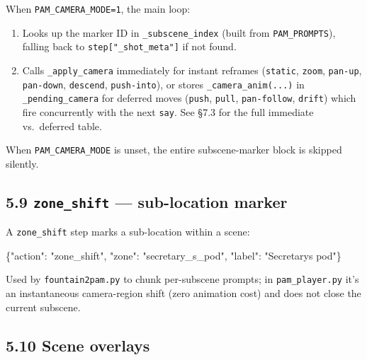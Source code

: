 \documentclass[
  11pt,
]{book}
\newenvironment{Shaded}{}{}
\newcommand{\DataTypeTok}[1]{\textcolor[rgb]{0.56,0.13,0.00}{#1}}
\newcommand{\FunctionTok}[1]{\textcolor[rgb]{0.02,0.16,0.49}{#1}}
\newcommand{\StringTok}[1]{\textcolor[rgb]{0.25,0.44,0.63}{#1}}
\providecommand{\tightlist}{%
  \setlength{\itemsep}{0pt}\setlength{\parskip}{0pt}}
\begin{document}
When \texttt{PAM\_CAMERA\_MODE=1}, the main loop:

\begin{enumerate}
\def\labelenumi{\arabic{enumi}.}
\tightlist
\item
  Looks up the marker ID in \texttt{\_subscene\_index} (built from
  \texttt{PAM\_PROMPTS}), falling back to
  \texttt{step{[}"\_shot\_meta"{]}} if not found.
\item
  Calls \texttt{\_apply\_camera} immediately for instant reframes
  (\texttt{static}, \texttt{zoom}, \texttt{pan-up}, \texttt{pan-down},
  \texttt{descend}, \texttt{push-into}), or stores
  \texttt{\_camera\_anim(...)} in \texttt{\_pending\_camera} for
  deferred moves (\texttt{push}, \texttt{pull}, \texttt{pan-follow},
  \texttt{drift}) which fire concurrently with the next \texttt{say}.
  See §7.3 for the full immediate vs.\ deferred table.
\end{enumerate}

When \texttt{PAM\_CAMERA\_MODE} is unset, the entire subscene-marker
block is skipped silently.

\subsection{\texorpdfstring{5.9 \texttt{zone\_shift} --- sub-location
marker}{5.9 zone\_shift --- sub-location marker}}\label{zone_shift-sub-location-marker}

A \texttt{zone\_shift} step marks a sub-location within a scene:

\begin{Shaded}
\begin{Highlighting}[]
\FunctionTok{\{}\DataTypeTok{"action"}\FunctionTok{:} \StringTok{"zone\_shift"}\FunctionTok{,} \DataTypeTok{"zone"}\FunctionTok{:} \StringTok{"secretary\_s\_pod"}\FunctionTok{,}
 \DataTypeTok{"label"}\FunctionTok{:} \StringTok{"Secretary\textquotesingle{}s pod"}\FunctionTok{\}}
\end{Highlighting}
\end{Shaded}

Used by \texttt{fountain2pam.py} to chunk per-subscene prompts; in
\texttt{pam\_player.py} it's an instantaneous camera-region shift (zero
animation cost) and does not close the current subscene.

\subsection{5.10 Scene overlays}\label{scene-overlays}
\end{document}
